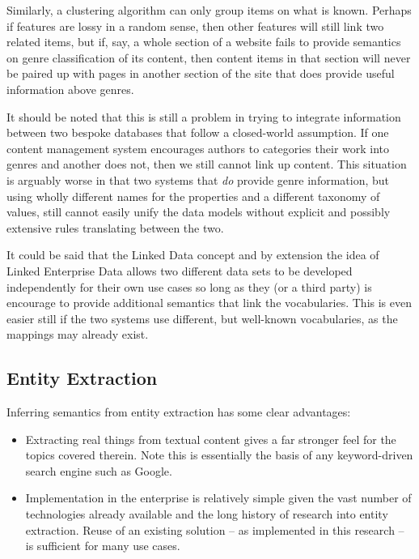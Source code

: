 Similarly, a clustering
algorithm can only group items on what is known. Perhaps if features
are lossy in a random sense, then other features will still link
two related items, but if, say, a whole section of a website fails
to provide semantics on genre classification of its content, then
content items in that section will never be paired up with pages
in another section of the site that does provide useful information
above genres.

It should be noted that this is still a problem in trying to integrate
information between two bespoke databases that follow a closed-world
assumption. If one content management system encourages authors to
categories their work into genres and another does not, then we
still cannot link up content. This situation is arguably worse in that
two systems that \emph{do} provide genre information, but using wholly
different names for the properties and a different taxonomy of values,
still cannot easily unify the data models without explicit and
possibly extensive rules translating between the two.

It could be said that the Linked Data concept and by extension the
idea of Linked Enterprise Data allows two different data sets to be
developed independently for their own use cases so long as they
(or a third party) is encourage to provide additional semantics that
link the vocabularies. This is even easier still if the two systems
use different, but well-known vocabularies, as the mappings may
already exist.

\subsection{Entity Extraction}
\label{sec:anal-entity}

Inferring semantics from entity extraction has some clear advantages:

\begin{itemize}
\item Extracting real things from textual content gives a far
  stronger feel for the topics covered therein. Note this is
  essentially the basis of any keyword-driven search engine such
  as Google.
\item Implementation in the enterprise is relatively simple given
  the vast number of technologies already available and the long
  history of research into entity extraction. Reuse of an existing
  solution -- as implemented in this research -- is sufficient for
  many use cases.
\end{itemize}

